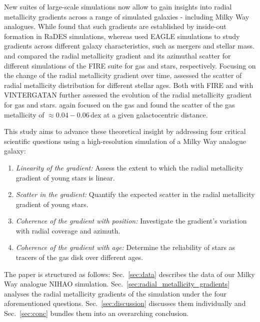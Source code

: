 \documentclass[fleqn,usenatbib]{mnras}
\begin{document}
New suites of large-scale simulations now allow to gain insights into radial metallicity gradients across a range of simulated galaxies - including Milky Way analogues. While \citet{Pilkington2012} found that such gradients are established by inside-out formation in RaDES simulations, whereas \citet{Tissera2019} used EAGLE simulations to study gradients across different galaxy characteristics, such as mergers and stellar mass. \citet{Bellardini2021} and \citet{Bellardini2022, Graf2024} compared the radial metallicity gradient and its azimuthal scatter for different simulations of the FIRE suite for gas and stars, respectively. Focusing on the change of the radial metallicity gradient over time, \citet{Grand2015} assessed the scatter of radial metallicity distribution for different stellar ages. Both \citet[][see their Fig. 6]{Ma2017} with FIRE and \citet[see their Fig. 9][]{Agertz2021} with VINTERGATAN further assessed the evolution of the radial metallicity gradient for gas and stars. \citet{Khoperskov2023e} again focused on the gas and found the scatter of the gas metallicity of $\approx 0.04-0.06\,\mathrm{dex}$ at a given galactocentric distance.

This study aims to advance these theoretical insight by addressing four critical scientific questions using a high-resolution simulation of a Milky Way analogue galaxy:
\begin{enumerate}
\item \textit{Linearity of the gradient:} Assess the extent to which the radial metallicity gradient of young stars is linear.
\item \textit{Scatter in the gradient:} Quantify the expected scatter in the radial metallicity gradient of young stars.
\item \textit{Coherence of the gradient with position:} Investigate the gradient's variation with radial coverage and azimuth.
\item \textit{Coherence of the gradient with age:} Determine the reliability of stars as tracers of the gas disk over different ages.
\end{enumerate}

The paper is structured as follows: Sec.~\ref{sec:data} describes the data of our Milky Way analogue NIHAO simulation. Sec.~\ref{sec:radial_metallicity_gradients} analyses the radial metallicity gradients of the simulation under the four aforementioned questions. Sec.~\ref{sec:discussion} discusses them individually and Sec.~\ref{sec:conc} bundles them into an overarching conclusion.
\end{document}
